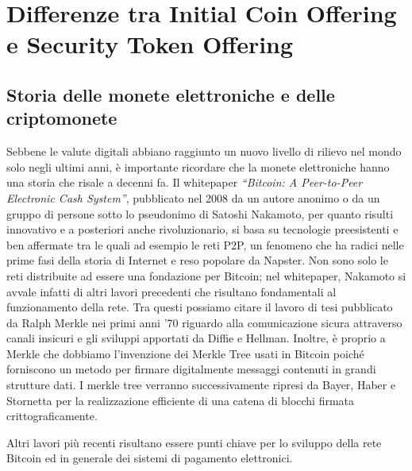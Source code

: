 \chapter{Differenze tra Initial Coin Offering e Security Token Offering}                %
\lhead[\fancyplain{}{\bfseries\thepage}]{\fancyplain{}{\bfseries\rightmark}}

\section{Storia delle monete elettroniche e delle criptomonete}

Sebbene le valute digitali abbiano raggiunto un nuovo livello di rilievo nel mondo solo negli ultimi anni, è importante ricordare che la monete elettroniche hanno una storia che risale a decenni fa. Il whitepaper \textit{“Bitcoin: A Peer-to-Peer Electronic Cash System”}\cite{K1}, pubblicato nel 2008 da un autore anonimo o da un gruppo di persone sotto lo pseudonimo di Satoshi Nakamoto, per quanto risulti innovativo e a posteriori anche rivoluzionario, si basa su tecnologie preesistenti e ben affermate tra le quali ad esempio le reti P2P, un fenomeno che ha radici nelle prime fasi della storia di Internet e reso popolare da Napster. Non sono solo le reti distribuite ad essere una fondazione per Bitcoin; nel whitepaper, Nakamoto si avvale infatti di altri lavori precedenti che risultano fondamentali al funzionamento della rete. Tra questi possiamo citare il lavoro di tesi pubblicato da Ralph Merkle nei primi anni ’70  riguardo alla comunicazione sicura attraverso canali insicuri e gli sviluppi apportati da Diffie e Hellman\cite{K2,K3}. Inoltre, è proprio a Merkle che dobbiamo l’invenzione dei Merkle Tree usati in Bitcoin poiché forniscono un metodo per firmare digitalmente messaggi contenuti in grandi strutture dati\cite{K4}. I merkle tree verranno successivamente ripresi da Bayer, Haber e Stornetta per la realizzazione efficiente di una catena di blocchi firmata crittograficamente\cite{K5}.


Altri lavori più recenti risultano essere punti chiave per lo sviluppo della rete Bitcoin ed in generale dei sistemi di pagamento elettronici.


